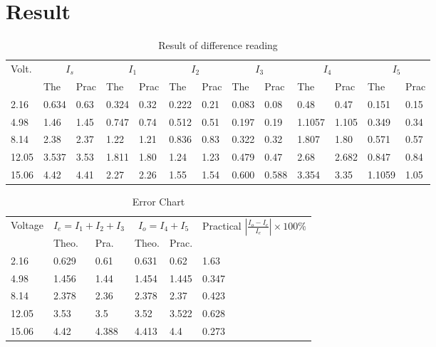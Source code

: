 \documentclass[a4paper,12pt]{article}
\begin{document}
\begin{itemize}
\end{itemize}

\section*{Result}
\begin{table}[!htbp]
\begin{tabularx}{\columnwidth}{@{}X|XX|XX|XX|XX|XX|XX@{}}
\toprule
\multirow{2}{*}{Volt.} & \multicolumn{2}{c|}{$I_s$} & \multicolumn{2}{c|}{$I_1$} & \multicolumn{2}{c|}{$I_2$} & \multicolumn{2}{c|}{$I_3$} & \multicolumn{2}{c|}{$I_4$} & \multicolumn{2}{c}{$I_5$}\\
\cline{2-13}
& The & Prac & The & Prac & The & Prac & The & Prac & The & Prac & The & Prac\\
\cline{1-13}
2.16 & 0.634 & 0.63 & 0.324 & 0.32 & 0.222 & 0.21 & 0.083 & 0.08 & 0.48 & 0.47 & 0.151 & 0.15\\
4.98 & 1.46 & 1.45 & 0.747 & 0.74 & 0.512 & 0.51 & 0.197 & 0.19 & 1.1057 & 1.105 & 0.349 & 0.34\\
8.14 & 2.38 & 2.37 & 1.22 & 1.21 & 0.836 & 0.83 & 0.322 & 0.32 & 1.807 & 1.80 & 0.571 & 0.57\\
12.05 & 3.537 & 3.53 & 1.811 & 1.80 & 1.24 & 1.23 & 0.479 & 0.47 & 2.68 & 2.682 & 0.847 & 0.84\\
15.06 & 4.42 & 4.41 & 2.27 & 2.26 & 1.55 & 1.54 & 0.600 & 0.588 & 3.354 & 3.35 & 1.1059 & 1.05\\
\bottomrule
\end{tabularx}
\caption{Result of difference reading}
\end{table}


\begin{table}[!htbp]
\begin{tabularx}{\columnwidth}{@{}X|XX|XX|X@{}}
\toprule
\multirow{2}{*}{Voltage} & \multicolumn{2}{c|}{$I_e=I_1+I_2+I_3$} & \multicolumn{2}{c|}{$I_o=I_4+I_5$} & \multirow{2}{*}{Practical $\left|\frac{I_o-I_e}{I_e}\right|\times 100\%$}\\
\cline{2-5}
 & Theo. & Pra. & Theo. & Prac.\\
 \cline{1-6}
 2.16 & 0.629 & 0.61 & 0.631 & 0.62 & 1.63\\
 4.98 & 1.456 & 1.44 & 1.454 & 1.445 & 0.347\\
 8.14 & 2.378 & 2.36 & 2.378 & 2.37 & 0.423\\
 12.05 & 3.53 & 3.5 & 3.52 & 3.522 & 0.628\\
 15.06 & 4.42 & 4.388 & 4.413 & 4.4 & 0.273\\
\bottomrule
\end{tabularx}
\caption{Error Chart}
\end{table}
\end{document}
